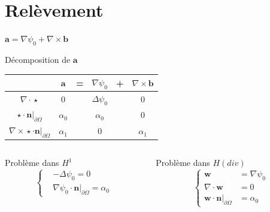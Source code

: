 \documentclass{beamer}
\newcommand{\grad}{{\nabla}}
\newcommand{\laplace}{{\Delta}}
\newcommand{\rot}{{\nabla\times}}
\renewcommand{\div}{{\nabla\cdot}}
\newcommand{\restr}{{\big\rvert_{\partial\Omega}}}
\begin{document}
\section{Relèvement}
\begin{frame}{$\mathbf{a}=\grad\psi_0+\rot \mathbf{b}$}
\label{psi0}
\begin{block}{Décomposition de $\mathbf{a}$}
\begin{center}
\begin{tabular}{c|ccccc}
& $\mathbf{a}$ & = & $\grad\psi_0$ & + & $\rot \mathbf{b}$ \\ \hline
$\div\star$ & 0 & & $\laplace\psi_0$ & & 0\\ \hline
$\star\cdot \mathbf{n}\restr$ & $\alpha_0$ & & $\alpha_0$ & & 0\\ \hline
$\rot\star\cdot \mathbf{n}\restr$ & $\alpha_1$ & & 0 & & $\alpha_1$
\end{tabular}
\end{center}
\end{block}
\begin{columns}[t]
\begin{column}{5cm}
\begin{block}{Problème dans $ H^1$}
\[\left\{\begin{aligned}
&-\laplace\psi_0 = 0\\
&\grad\psi_0\cdot \mathbf{n}\restr=\alpha_0
\end{aligned}\right.\]
\end{block}
\end{column}
\begin{column}{5cm}
\begin{block}{Problème dans $ H(div)$}
\[\left\{\begin{aligned}
\mathbf{w} &= \grad \psi_0\\
\div \mathbf{w} &= 0\\
\mathbf{w}\cdot \mathbf{n}\restr &= \alpha_0
\end{aligned}\right.\]
\end{block}
\end{column}
\end{columns}
\end{frame}
\end{document}
